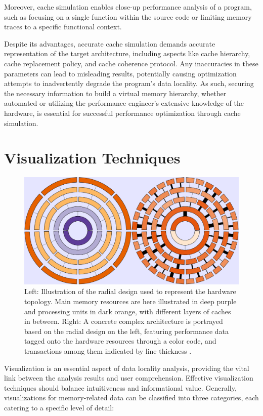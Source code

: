 Moreover, cache simulation enables close-up performance analysis of a program, such as focusing on a single function within the source code or limiting memory traces to a specific functional context.

Despite its advantages, accurate cache simulation demands accurate representation of the target architecture, including aspects like cache hierarchy, cache replacement policy, and cache coherence protocol. Any inaccuracies in these parameters can lead to misleading results, potentially causing optimization attempts to inadvertently degrade the program's data locality. As such, securing the necessary information to build a virtual memory hierarchy, whether automated or utilizing the performance engineer's extensive knowledge of the hardware, is essential for successful performance optimization through cache simulation.

\section{Visualization Techniques}\label{sec:visualization}
\begin{figure}
	\centering
	\includegraphics[width=\linewidth]{pictures/memaxes_cache.png}
	\caption{Left: Illustration of the radial design used to represent the hardware topology. Main memory resources are here illustrated in deep purple and processing units in dark orange, with different layers of caches in between. Right: A concrete complex architecture is portrayed based on the radial design on the left, featuring performance data tagged onto the hardware resources through a color code, and transactions among them indicated by line thickness \cite{gimenez2017memaxes}.}
	\label{fig:memaxes_cache}
\end{figure}

Visualization is an essential aspect of data locality analysis, providing the vital link between the analysis results and user comprehension. Effective visualization techniques should balance intuitiveness and informational value. Generally, visualizations for memory-related data can be classified into three categories, each catering to a specific level of detail:

